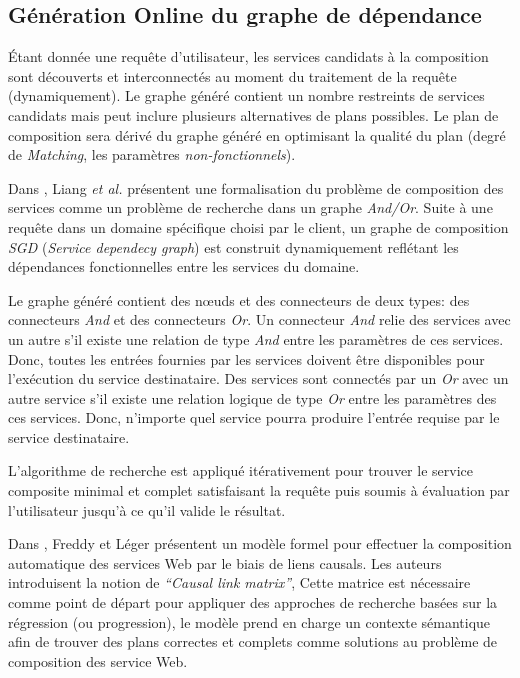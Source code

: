   \newpage
  \subsection{Génération Online du graphe de dépendance}
  \label{sec:generation-online}
  Étant donnée une requête d'utilisateur, les services candidats à
  la composition sont découverts et interconnectés au moment du
  traitement de la requête (dynamiquement). Le graphe généré
  contient un nombre restreints de services candidats mais peut
  inclure plusieurs alternatives de plans possibles. Le plan de
  composition sera dérivé du graphe généré en optimisant la qualité du
  plan (degré de \textit{Matching}, les paramètres
  \textit{non-fonctionnels}).\bigskip

  Dans \cite{liang2005and}, Liang \textit{et al.} présentent une
  formalisation du problème de composition des services comme un
  problème de recherche dans un graphe \textit{And/Or}. Suite à une
  requête dans un domaine spécifique choisi par le client, un graphe
  de composition \textit{SGD} (\textit{Service dependecy graph}) est
  construit dynamiquement reflétant les dépendances fonctionnelles
  entre les services du domaine.\medskip

  Le graphe généré contient des nœuds et des connecteurs de deux
  types: des connecteurs \textit{And} et des connecteurs
  \textit{Or}. Un connecteur \textit{And} relie des services avec un
  autre s'il existe une relation de type \textit{And} entre
  les paramètres de ces services. Donc, toutes les entrées fournies par
  les services doivent être disponibles pour l'exécution du service
  destinataire. Des services sont connectés par un \textit{Or} avec un
  autre service s'il existe une relation logique de type \textit{Or}
  entre les paramètres des ces services. Donc, n'importe quel service
  pourra produire l'entrée requise par le service
  destinataire.\medskip

  L'algorithme de recherche est appliqué itérativement pour trouver le
  service composite minimal et complet satisfaisant la requête puis
  soumis à évaluation par l'utilisateur jusqu'à ce qu'il valide le
  résultat.\bigskip

  Dans \cite{lecue2006formal}, Freddy et Léger présentent un modèle
  formel pour effectuer la composition automatique des services Web par
  le biais de liens causals. Les auteurs introduisent la notion de
  \textit{``Causal link matrix''}, Cette matrice est nécessaire comme
  point de départ pour appliquer des approches de recherche basées sur
  la régression (ou progression), le modèle prend en charge un
  contexte sémantique afin de trouver des plans correctes et complets
  comme solutions au problème de composition des service Web.\bigskip

